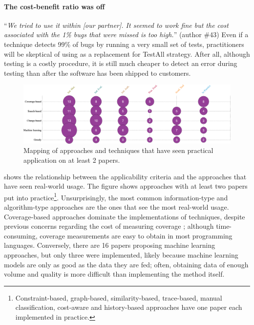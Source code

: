 \paragraph{The cost-benefit ratio was off}
``\textit{We tried to use it within [our partner]. It seemed to work fine but the cost associated with the 1\% bugs that were missed is too high.}'' (author \#43)
Even if a \tcs technique detects 99\% of bugs by running a very small set of tests, practitioners will be skeptical of using as a replacement for TestAll strategy.
After all, although testing is a costly procedure, it is still much cheaper to detect an error during testing than after the software has been shipped to customers.

\begin{figure}
  \center
  \includegraphics[width=\linewidth]{figures/approaches_applicability.png}
  \caption{Mapping of approaches and techniques that have seen practical application on at least 2 papers.}
  \label{fig:approaches_applicability}
\end{figure}

 shows the relationship between the applicability criteria and the approaches that have seen real-world usage.
The figure shows approaches with at least two papers put into practice\footnote{Constraint-based, graph-based, similarity-based, trace-based, manual classification, cost-aware and history-based approaches have one paper each implemented in practice.}.
Unsurprisingly, the most common information-type and algorithm-type approaches are the ones that see the most real-world usage.
Coverage-based approaches dominate the implementations of techniques, despite previous concerns regarding the cost of measuring coverage \cite{herzigkeynote}; although time-consuming, coverage measurements are easy to obtain in most programming languages.
Conversely, there are 16 papers proposing machine learning approaches, but only three were implemented, likely because machine learning models are only as good as the data they are fed; often, obtaining data of enough volume and quality is more difficult than implementing the method itself.

